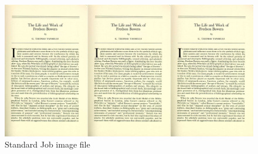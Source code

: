 \documentclass[a4paper]{IEEEtran}
\begin{document}
\begin{landscape}
\appendix

\begin{figure}[h]
\centering
\includegraphics[width=700pt]{standardfile}
\caption{Standard Job image file}
\label{fig_standardjob}
\end{figure}
\end{landscape}
\clearpage
\end{document}
